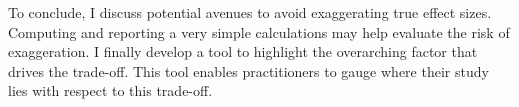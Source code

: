 To conclude, I discuss potential avenues to avoid exaggerating true effect sizes. Computing and reporting a very simple calculations may help evaluate the risk of exaggeration. I finally develop a tool to highlight the overarching factor that drives the trade-off. This tool enables practitioners to gauge where their study lies with respect to this trade-off.